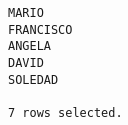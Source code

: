 \documentclass[11pt]{report}
\begin{document}
\begin{itemize}
\begin{verbatim}
MARIO                                                                                                                                                                                                                                                                                                                                                                                                                                                                                                               
FRANCISCO                                                                                                                                                                                                                                                                                                                                                                                                                                                                                                           
ANGELA                                                                                                                                                                                                                                                                                                                                                                                                                                                                                                              
DAVID                                                                                                                                                                                                                                                                                                                                                                                                                                                                                                               
SOLEDAD                                                                                                                                                                                                                                                                                                                                                                                                                                                                                                             

7 rows selected.
  \end{verbatim}
\end{itemize}
\end{document}
